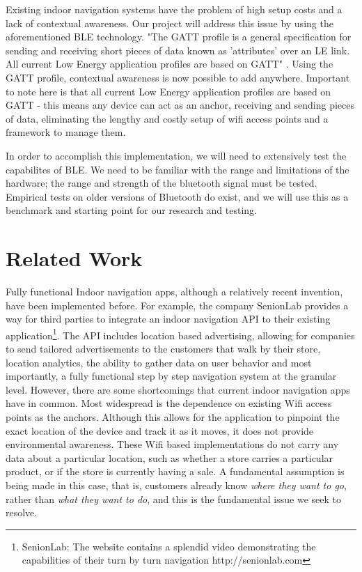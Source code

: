 \documentclass{sig-alternate}
\begin{document}
Existing indoor navigation systems have the problem of high setup
costs and a lack of contextual awareness. Our project will address
this issue by using the aforementioned BLE technology.  "The GATT 
profile is a general specification for sending and receiving short pieces 
of data known as 'attributes' over an LE link. All current Low Energy 
application profiles are based on GATT" \cite{bluetooth}. Using the
GATT profile, contextual awareness is now possible to add anywhere.
Important to note here is that all current Low Energy application 
profiles are based on GATT - this means any device can act as an
anchor, receiving and sending pieces of data, eliminating the lengthy
and costly setup of wifi access points and a framework to manage 
them.

In order to accomplish this implementation, we will need to extensively
test the capabilites of BLE. We need to be familiar with the range and
limitations of the hardware; the range and strength of the bluetooth
signal must be tested. Empirical tests on older versions of Bluetooth
do exist, and we will use this as a benchmark and starting point for our
research and testing\cite{cheung}.


\section{Related Work}
\label{sec:related_work}
Fully functional Indoor navigation apps, although a relatively recent 
invention, have been implemented before. For example, the company
SenionLab provides a way for third parties to integrate an indoor
navigation API to their existing application\cite{senion}\footnote{
SenionLab: The website contains a splendid video demonstrating 
the capabilities of their turn by turn navigation http://senionlab.com}.
The API includes location based advertising, allowing for companies to 
send tailored advertisements to the customers that walk by their store, 
location analytics, the ability to gather data on user behavior and most
importantly, a fully functional step by step navigation system at the
granular level. However, there are some shortcomings that current
indoor navigation apps have in common. Most widespread is the 
dependence on existing Wifi access points as the anchors. Although 
this allows for the application to pinpoint the exact location of the 
device and track it as it moves, it does not provide environmental
awareness. These Wifi based implementations do not carry any 
data about a particular location, such as whether a store carries a 
particular product, or if the store is currently having a sale. A 
fundamental assumption is being made in this case, that is, 
customers already know \textit{where they want to go}, rather than 
\textit{what they want to do}, and this is the fundamental issue
we seek to resolve.
\end{document}
